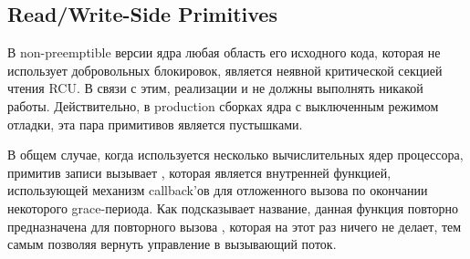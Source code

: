 \subsection{Read/Write-Side Primitives} \label{sec:api_impl}
В non-preemptible версии ядра любая область его исходного кода,
которая не использует добровольных блокировок, является неявной
критической секцией чтения RCU. В связи с этим, реализации
 и  не должны выполнять
никакой работы. Действительно, в production сборках ядра
с выключенным режимом отладки, эта пара примитивов является
пустышками.

В общем случае, когда используется несколько вычислительных ядер процессора,
примитив записи  вызывает ,
которая является внутренней функцией, использующей механизм callback'ов
для отложенного вызова  по окончании некоторого grace-периода.
Как подсказывает название, данная функция повторно предназначена для повторного вызова
, которая на этот раз ничего не делает,
тем самым позволяя  вернуть управление в вызывающий поток.

%

%
